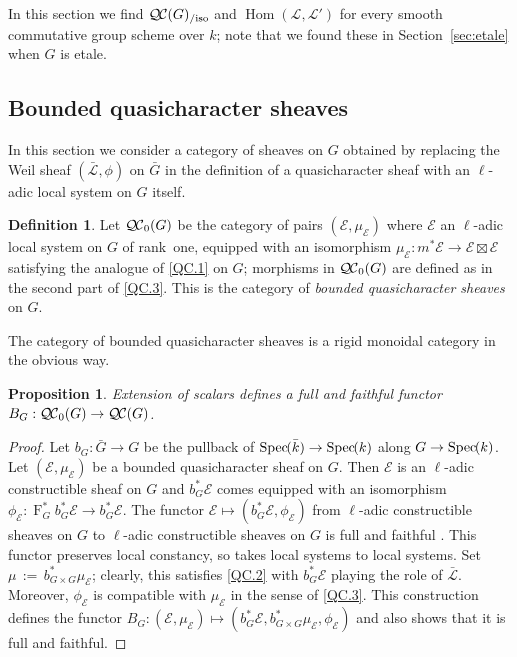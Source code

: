 \documentclass{amsart}
\theoremstyle{plain}
\newtheorem{proposition}[theorem]{Proposition}
\theoremstyle{definition}
\newtheorem{definition}[theorem]{Definition}
\theoremstyle{remark}
\newcommand{\bFq}{\bar{k}}
\newcommand{\Fq}{k}
\newcommand{\Frob}[1]{\operatorname{F}_{#1}}
\DeclareMathOperator{\Hom}{Hom}
\newcommand{\Spec}[1]{{\operatorname{Spec}\hskip-1pt( #1 )}}
\newcommand{\ceq}{{\, :=\, }}
\newcommand{\qcs}[1]{{\mathcal{#1}}}
\newcommand{\gqcs}[1]{{\mathcal{\bar #1}}}
\newcommand{\QC}{{\mathcal{Q\hskip-0.8pt C}}}
\newcommand{\bQC}{{\QC_0}}
\newcommand{\QCiso}[1]{\QC(#1)_{/\text{iso}}}
\newcommand{\bG}{\bar{G}}
\begin{document}
In this section we find $\QCiso{G}$ and $\Hom(\qcs{L},\qcs{L}')$ for every smooth commutative group scheme over $\Fq$; note that we found these in Section~\ref{sec:etale} when $G$ is etale. 

\subsection{Bounded quasicharacter sheaves}\label{sec:bounded}

In this section we consider a category of sheaves on $G$ obtained by
replacing the Weil sheaf $(\gqcs{L}, \phi)$ on $\bG$ in the definition of a quasicharacter sheaf with an $\ell$-adic local system on $G$ itself.

\begin{definition}
Let $\bQC(G)$ be the category of pairs $(\qcs{E},\mu_\qcs{E})$
where $\qcs{E}$ an $\ell$-adic local system on $G$ of rank~one,
equipped with an isomorphism $\mu_\qcs{E} : m^* \qcs{E} \to \qcs{E} \boxtimes \qcs{E}$
satisfying the analogue of \ref{QC.1} on $G$;
morphisms in $\bQC(G)$ are defined as in the second part of
\ref{QC.3}.
This is the category of \emph{bounded quasicharacter sheaves} on $G$.
\end{definition}

The category of bounded quasicharacter sheaves is a rigid monoidal category in the obvious way.

\begin{proposition}\label{prop:BG}
Extension of scalars defines a full and faithful functor $B_G : \bQC(G) \to \QC(G)$.
\end{proposition}

\begin{proof}
 Let $b_G : {\bar G} \to G$ be the pullback of $\Spec{\bFq} \to \Spec{\Fq}$ along $G\to \Spec{\Fq}$.
 Let $(\qcs{E},\mu_\qcs{E})$ be a bounded quasicharacter sheaf on $G$.
 Then $\qcs{E}$ is an $\ell$-adic constructible sheaf on $G$ and
 $b_G^* \qcs{E}$ comes equipped with an isomorphism
 $\phi_\qcs{E} : \Frob{G}^* b_G^*\qcs{E} \to b_G^* \qcs{E}$.
 The functor $\qcs{E} \mapsto (b_G^* \qcs{E},\phi_\qcs{E})$
 from $\ell$-adic constructible sheaves on $G$ to $\ell$-adic constructible sheaves on $G$
 is full and faithful .
 This functor preserves local constancy, so takes local systems to local systems.
 Set $\mu \ceq b_{G\times G}^*\mu_\qcs{E}$; clearly, this satisfies \ref{QC.2}
 with $b_G^*\qcs{E}$ playing the role of $\gqcs{L}$.
 Moreover, $\phi_\qcs{E}$ is compatible with $\mu_\qcs{E}$ in the sense of \ref{QC.3}.
 This construction defines the functor $B_G : (\qcs{E},\mu_\qcs{E}) \mapsto (b_G^*\qcs{E},b_{G\times G}^*\mu_\qcs{E}, \phi_\qcs{E})$
 and also shows that it is full and faithful.
\end{proof}
\end{document}

